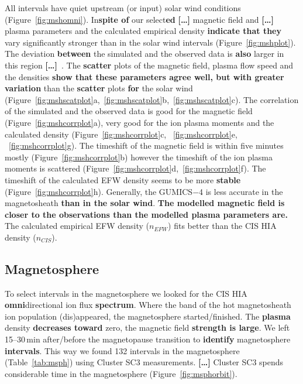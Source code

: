 \documentclass[linenumbers,draft]{agujournal}
\begin{document}
All intervals have quiet upstream (or input) solar wind conditions (Figure~\ref{fig:mshomni}). In\textbf{spite of} our select\textbf{ed} \textbf{[\dots]} magnetic field and \textbf{[\dots]} plasma parameters and the calculated empirical density \textbf{indicate that they} vary significantly stronger than in the solar wind intervals (Figure~\ref{fig:mshplot}). The deviation \textbf{between} the simulated and the observed data is \textbf{also} larger in this region \textbf{[\dots]}\ . The \textbf{scatter} plots of the magnetic field, plasma flow speed and the densities \textbf{show that these parameters agree well, but with greater variation} than the \textbf{scatter} plots \textbf{for} the solar wind (Figure~\ref{fig:mshscatplot}a,~\ref{fig:mshscatplot}b,~\ref{fig:mshscatplot}c). The correlation of the simulated and the observed data is good for the magnetic field (Figure~\ref{fig:mshcorrplot}a), very good for the ion plasma moments and the calculated density (Figure~\ref{fig:mshcorrplot}c, ~\ref{fig:mshcorrplot}e, ~\ref{fig:mshcorrplot}g). The timeshift of the magnetic field is within five minutes mostly (Figure~\ref{fig:mshcorrplot}b) however the timeshift of the ion plasma moments is scattered (Figure~\ref{fig:mshcorrplot}d,~\ref{fig:mshcorrplot}f). The timeshift of the calculated EFW density seems to be more \textbf{stable} (Figure~\ref{fig:mshcorrplot}h). Generally, the GUMICS$-$4 is less accurate in the magnetosheath \textbf{than in the solar wind}. \textbf{The modelled magnetic field is closer to the observations than the modelled plasma parameters are.} The calculated empirical EFW density ($n_{EFW}$) fits better than the CIS HIA density ($n_{CIS}$).

\subsection{Magnetosphere}
\label{sec:msph}

To select intervals in the magnetosphere we looked for the CIS HIA \textbf{omni}directional ion flux \textbf{spectrum}. Where the band of the hot magnetosheath ion population (dis)appeared, the magnetosphere started/finished. The \textbf{plasma} density \textbf{decreases toward} zero, the magnetic field \textbf{strength is large}. We left 15--30\,min after/before the magnetopause transition to \textbf{identify} magnetosphere \textbf{intervals}. This way we found 132 intervals in the magnetosphere (Table~\ref{tab:msph}) using Cluster SC3 measurements. \textbf{[\dots]} Cluster SC3 spends considerable time in the magnetosphere (Figure~\ref{fig:msphorbit}). 
\end{document}
